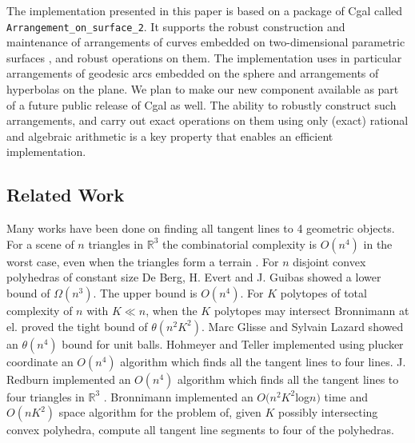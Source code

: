 \documentclass[11pt]{article}
\def\ccode#1{{\small{\texttt{#1}}}}
\newcommand{\aos}{\ccode{Arrangement\_on\_surface\_2}}
\begin{document}
The implementation presented in this paper is based on a package of Cgal
called\\ \aos \cite{fwh-cfpeg-04,wfzh-aptaca-05}. It 
supports the robust construction and maintenance of arrangements of curves 
embedded on two-dimensional parametric surfaces \cite{bfhmw-scmtd-07}, and 
robust operations on them.
The implementation uses in particular arrangements of geodesic arcs embedded on
the sphere and arrangements of hyperbolas on the plane. We plan to make our new
component available as part of a future public release of Cgal as well. The
ability to robustly construct such arrangements, and carry out exact operations
on them using only (exact) rational and algebraic  arithmetic is a key property
that enables an efficient implementation.

\subsection{Related Work}
\label{ssec:related-work}
Many works have been done on finding all tangent lines to 4 geometric objects.
For a scene of $n$ triangles in $\mathbb{R}^3$ the combinatorial complexity is
$O(n^4)$ in the worst case, even when the triangles form a terrain 
\cite{Cole198911}. For $n$ disjoint convex polyhedras of constant size De Berg, 
H. Evert and J. Guibas \cite{deBerg199869} showed a lower bound of 
$\Omega(n^3)$. The upper bound is $O(n^4)$. For $K$ polytopes of total 
complexity of $n$ with $K \ll n$, when the $K$ polytopes may intersect Bronnimann
at el. \cite{Devillers06linesand} proved the tight bound of $\theta(n^{2}K^{2})$.
Marc Glisse and Sylvain Lazard \cite{1810969} showed an $\theta(n^4)$ bound for
unit balls.\newline
Hohmeyer and Teller \cite{TellerHohmeyer99} implemented using plucker coordinate
an $O(n^4)$ algorithm which finds all the tangent lines to four lines.
J. Redburn implemented an $O(n^4)$ algorithm which finds all the tangent lines 
to four triangles in  $\mathbb{R}^3$  \cite{J-Redburn-03}. Bronnimann implemented an 
$O(n^2K^2$log$n)$ time and $O(nK^2)$ space algorithm for the problem of, given 
$K$ possibly intersecting convex polyhedra, compute all tangent line segments to 
four of the polyhedras.

\label{sec:intro}
\end{document}
